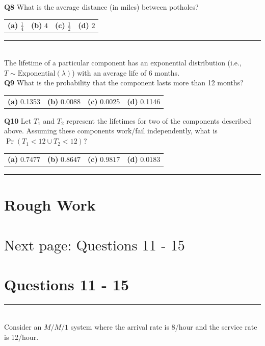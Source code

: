 \documentclass[12pt]{article}
\begin{document}
{\bf Q8} What is the average distance (in miles) between potholes?\\[0.2cm]
\begin{tabular}{cccc}
{\bf(a)} $\frac{1}{4}$ & {\bf(b)} $4$ & {\bf(c)} $\frac{1}{2}$ & {\bf(d)} $2$ \\[0.6cm]
\end{tabular}

\rule{\linewidth}{1pt}
\quad\\
The lifetime of a particular component has an exponential distribution (i.e., $T \sim \text{Exponential}(\lambda)$) with an average life of 6 months.\\[0.3cm]
{\bf Q9} What is the probability that the component lasts more than 12 months? \\[0.2cm]
\begin{tabular}{cccc}
{\bf(a)} 0.1353 & {\bf(b)} 0.0088 & {\bf(c)} 0.0025 & {\bf(d)} 0.1146\\[0.6cm]
\end{tabular}

{\bf Q10} Let $T_1$ and $T_2$ represent the lifetimes for two of the components described above. Assuming these components work/fail independently, what is $\Pr(T_1 < 12 \cup T_2 < 12)$? \\[0.2cm]
\begin{tabular}{cccc}
{\bf(a)} $0.7477$ & {\bf(b)} $0.8647$ & {\bf(c)} $0.9817$  & {\bf(d)} $0.0183$ \\[0.6cm]
\end{tabular}

\rule{\linewidth}{1pt}

\newpage

\section*{Rough Work\\[23cm]}
\section*{\hspace{8cm}$\boxed{\text{Next page: Questions 11 - 15}}$}

\newpage

\section*{Questions 11 - 15}

\rule{\linewidth}{1pt}
\quad\\
Consider an $M/M/1$ system where the arrival rate is 8/hour and the service rate is 12/hour.\\[0.2cm]
\end{document}
